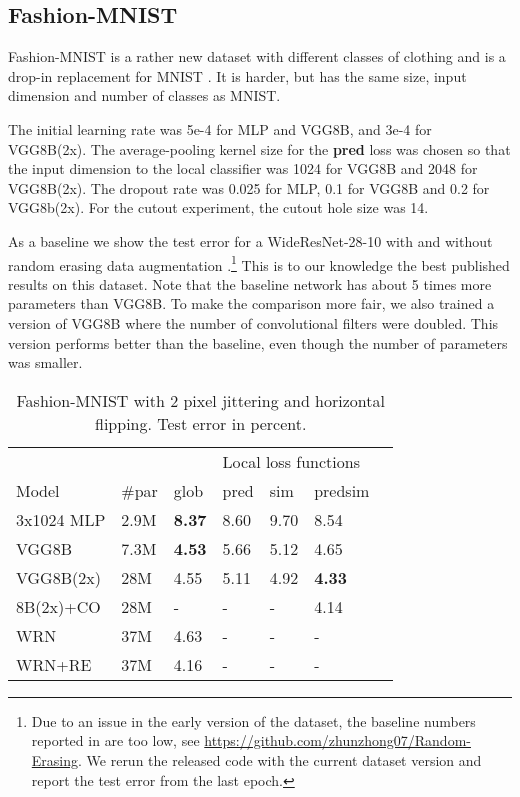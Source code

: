 \documentclass{article}
\begin{document}
\subsection{Fashion-MNIST}

Fashion-MNIST is a rather new dataset with different classes of clothing and is a drop-in replacement for MNIST \cite{Fashion17}. It is harder, but has the same size, input dimension and number of classes as MNIST. 

The initial learning rate was 5e-4 for MLP and VGG8B, and 3e-4 for VGG8B(2x). The average-pooling kernel size for the \textbf{pred} loss was chosen so that the input dimension to the local classifier was 1024 for VGG8B and 2048 for VGG8B(2x). The dropout rate was 0.025 for MLP, 0.1 for VGG8B and 0.2 for VGG8b(2x). For the cutout experiment, the cutout hole size was 14.

As a baseline we show the test error for a WideResNet-28-10 \cite{ZagoruykoK16} with and without random erasing data augmentation \cite{ZhongZKLY17}.\footnote{Due to an issue in the early version of the dataset, the baseline numbers reported in \cite{ZhongZKLY17} are too low, see \url{https://github.com/zhunzhong07/Random-Erasing}. We rerun the released code with the current dataset version and report the test error from the last epoch. } This is to our knowledge the best published results on this dataset. Note that the baseline network has about 5 times more parameters than VGG8B. To make the comparison more fair, we also trained a version of VGG8B where the number of convolutional filters were doubled. This version performs better than the baseline, even though the number of parameters was smaller.

\begin{table}[h]
  \caption{Fashion-MNIST with 2 pixel jittering and horizontal flipping. Test error in percent.}
  \label{table:fmnist}
  \centering
  \begin{tabular}{lllllll}
    \toprule
    &&& \multicolumn{3}{|l}{Local loss functions} \\
    Model   & \#par & glob & \multicolumn{1}{|l}{pred} & sim & \multicolumn{1}{l}{predsim}  \\
    \midrule
    3x1024 MLP & 2.9M &  \textbf{8.37} & \multicolumn{1}{|l}{8.60} & 9.70  & 8.54 \\
    VGG8B & 7.3M &  \textbf{4.53} & \multicolumn{1}{|l}{5.66} & 5.12  & 4.65 \\
    VGG8B(2x) & 28M & 4.55 & \multicolumn{1}{|l}{5.11} & 4.92 &  \textbf{4.33} \\
    8B(2x)+CO & 28M & - & \multicolumn{1}{|l}{-} & - &  4.14 \\
    \midrule
    WRN & 37M & 4.63  & \multicolumn{1}{|l}{-} & - & - \\
    WRN+RE& 37M & 4.16  & \multicolumn{1}{|l}{-} & - & - \\
    \bottomrule
  \end{tabular}
\end{table}
\end{document}
